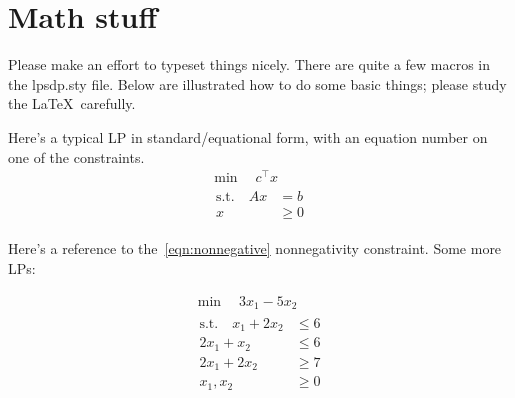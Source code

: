 \section{Math stuff}

Please make an effort to typeset things nicely.  There are quite a few macros in the lpsdp.sty file.  Below are illustrated how to do some basic things; please study the \LaTeX\ carefully.

Here's a typical LP in standard/equational form, with an equation number on one of the constraints.
\begin{gather}
    \min \quad c^\top x                       \nonumber\\
    \begin{align}
        \text{s.t.} \quad   Ax &= b           \nonumber\\
                             x &\geq 0       \label{eqn:nonnegative}
    \end{align}
\end{gather}

\noindent Here's a reference to the~\eqref{eqn:nonnegative} nonnegativity constraint.  Some more LPs:

\begin{gather*}
    \min \quad 3x_1 - 5x_2 \\
    \begin{aligned}
        \text{s.t.} \quad   x_1 + 2x_2 &\leq 6\\
                            2x_1 + x_2 &\leq 6\\
                            2x_1 + 2x_2 &\geq 7\\
                            x_1,x_2 &\geq 0
    \end{aligned}
\end{gather*}

